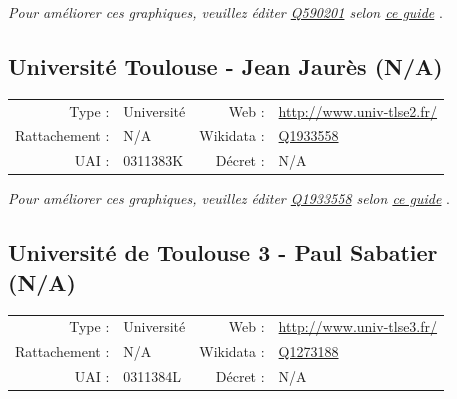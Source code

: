 \documentclass[11pt,french,landscape]{article}
\begin{document}
\textit{\scriptsize Pour améliorer ces graphiques, veuillez éditer \href{https://www.wikidata.org/entity/Q590201}{Q590201}  selon \href{https://github.com/cpesr/wikidataESR/blob/master/Rmd/wikidataESR.md}{ce guide}}
.


\newpage

\hypertarget{universituxe9-toulouse---jean-jauruxe8s-na}{%
\subsection{Université Toulouse - Jean Jaurès
(N/A)}\label{universituxe9-toulouse---jean-jauruxe8s-na}}

\begin{tabular*}{0.45\textwidth}{rp{2cm}rl}  
\hline  
Type : & Université & Web : &\href{http://www.univ-tlse2.fr/}{http://www.univ-tlse2.fr/} \\  
Rattachement : & N/A & Wikidata : & \href{https://www.wikidata.org/entity/Q1933558}{Q1933558} \\  
UAI : & 0311383K & Décret : & N/A \\  
\hline  
\end{tabular*}

\textit{\scriptsize Pour améliorer ces graphiques, veuillez éditer \href{https://www.wikidata.org/entity/Q1933558}{Q1933558}  selon \href{https://github.com/cpesr/wikidataESR/blob/master/Rmd/wikidataESR.md}{ce guide}}
.


\newpage

\hypertarget{universituxe9-de-toulouse-3---paul-sabatier-na}{%
\subsection{Université de Toulouse 3 - Paul Sabatier
(N/A)}\label{universituxe9-de-toulouse-3---paul-sabatier-na}}

\begin{tabular*}{0.45\textwidth}{rp{2cm}rl}  
\hline  
Type : & Université & Web : &\href{http://www.univ-tlse3.fr/}{http://www.univ-tlse3.fr/} \\  
Rattachement : & N/A & Wikidata : & \href{https://www.wikidata.org/entity/Q1273188}{Q1273188} \\  
UAI : & 0311384L & Décret : & N/A \\  
\hline  
\end{tabular*}
\end{document}

